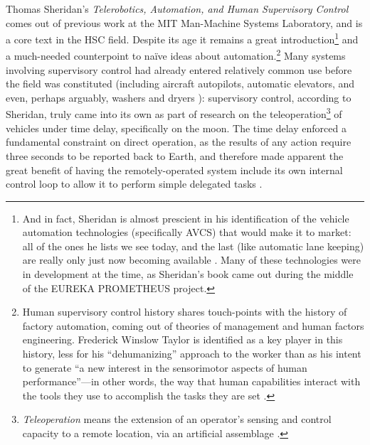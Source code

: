 
Thomas
Sheridan's \emph{Telerobotics, Automation, and Human Supervisory
  Control} comes out of previous work at the MIT Man-Machine Systems
Laboratory, and is a core text in the HSC field. Despite its
age it remains a great introduction\footnote{And in fact, Sheridan is almost prescient in his
  identification of the vehicle automation technologies (specifically AVCS) that would
  make it to market: all of the ones he lists we see today, and the
  last (like automatic lane keeping) are really only just now becoming
  available \cite[p. 256]{sheridan}. Many of these technologies were in development at the
  time, as Sheridan's book came out during the middle of the EUREKA
  PROMETHEUS project.} and a
much-needed counterpoint to na\"{i}ve ideas about automation.\footnote{Human
supervisory control history
shares touch-points with the history of factory automation, coming out of
theories of management and human factors 
engineering. Frederick Winslow Taylor is identified as a key player in
this history, less for his ``dehumanizing'' approach to the worker than
as
his intent to generate ``a new interest in the sensorimotor aspects of
human performance''---in other words, the way that human capabilities
interact with the tools they use to accomplish the tasks they are
set \cite[p. 7]{sheridan}.} Many systems involving supervisory
control had already entered relatively common use before the field was
constituted (including
aircraft autopilots, automatic elevators, and even, perhaps arguably,
washers and dryers \cite[p. 8]{sheridan}): supervisory
control, according to Sheridan, truly came into its own as part of
research on the teleoperation\footnote{\emph{Teleoperation} means the
  extension of an operator's sensing and control capacity to a remote
  location, via an artificial assemblage \cite[p. 4]{sheridan}.} of vehicles under time delay,
specifically on the moon. The time delay enforced a fundamental
constraint on direct operation, as the results of any action require
three seconds to be reported back to Earth, and therefore made
apparent the great benefit of having the remotely-operated system
include its own internal control loop to allow it to perform simple
delegated tasks \cite[p. 9]{sheridan}.


